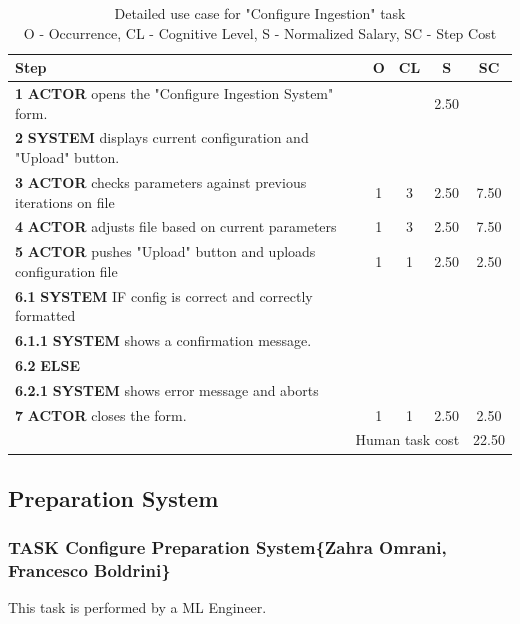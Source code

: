 \begin{table}[H]
\centering
\begin{tabularx}{\textwidth}{|X|c|c|c|c|}
\hline
\textbf{Step} & \textbf{O} & \textbf{CL} & \textbf{S} & \textbf{SC} \\
\hline
\textbf{1} \textbf{ACTOR} opens the "Configure Ingestion System" form. &  & & 2.50 & \\
\hline
\textbf{2} \textbf{SYSTEM} displays current configuration and "Upload" button. & & & & \\
\hline
\textbf{3} \textbf{ACTOR} checks parameters against previous iterations on file & 1 & 3 & 2.50 & 7.50 \\
\hline
\textbf{4} \textbf{ACTOR} adjusts file based on current parameters & 1 & 3 & 2.50 & 7.50 \\
\hline
\textbf{5} \textbf{ACTOR} pushes "Upload" button and uploads configuration file & 1 & 1 & 2.50 & 2.50 \\
\hline
\textbf{6.1} \textbf{SYSTEM} IF config is correct and correctly formatted & & & & \\
\hline
\textbf{6.1.1} \textbf{SYSTEM} shows a confirmation message. & & & & \\
\hline
\textbf{6.2} \textbf{ELSE} & & & & \\
\hline
\textbf{6.2.1} \textbf{SYSTEM} shows error message and aborts & & & & \\
\hline
\textbf{7} \textbf{ACTOR} closes the form. & 1 & 1 & 2.50 & 2.50 \\
\hline
\multicolumn{4}{|r|}{Human task cost} & 22.50 \\
\hline
\end{tabularx}
\caption{Detailed use case for "Configure Ingestion" task\\ 
O - Occurrence, CL - Cognitive Level, S - Normalized Salary, SC - Step Cost}
\label{table:configure_ingestion_system}
\end{table}

\subsection{Preparation System}

\subsubsection{TASK Configure Preparation System\{Zahra Omrani, Francesco Boldrini\}}
This task is performed by a ML Engineer.

